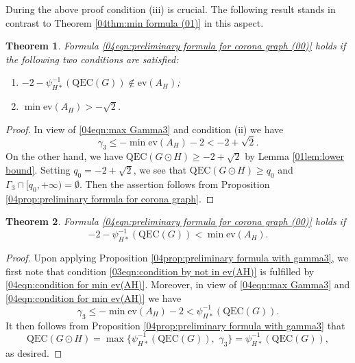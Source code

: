 \documentclass[12pt,a4paper]{article}
\newtheorem{theorem}{Theorem}[section]
\newcommand{\1}{{\bm 1}}
\numberwithin{equation}{section}
\begin{document}
During the above proof condition (iii) is crucial.
The following result stands in contrast to 
Theorem \ref{04thm:min formula (01)} in this aspect.

\begin{theorem}\label{04thm:min formula (02)}
Formula \eqref{04eqn:preliminary formula for corona graph (00)} holds if
the following two conditions are satisfied:
%
\begin{enumerate}
\item[\upshape (i)] 
$-2-\psi_{H*}^{-1}(\mathrm{QEC}(G)) \not\in\mathrm{ev}(A_H)$;
\item[\upshape (ii)]
$\min \mathrm{ev}(A_H)> -\sqrt{2}$.
\end{enumerate}
\end{theorem}

\begin{proof}
In view of \eqref{04eqn:max Gamma3} and condition (ii) we have
\[
\gamma_3
\le -\min \mathrm{ev}(A_H)-2
< -2+\sqrt2.
\]
On the other hand, we have
$\mathrm{QEC}(G\odot H)\ge -2+\sqrt2$ by Lemma \ref{01lem:lower bound}.
Setting $q_0=-2+\sqrt2$, we see that
$\mathrm{QEC}(G\odot H)\ge q_0$ and
$\Gamma_3\cap[q_0,+\infty)=\emptyset$.
Then the assertion follows from
Proposition \ref{04prop:preliminary formula for corona graph}.
\end{proof}


\begin{theorem}\label{04thm:min formula (03)}
Formula \eqref{04eqn:preliminary formula for corona graph (00)} holds if
%
\begin{equation}\label{04eqn:condition for min ev(AH)}
-2-\psi_{H*}^{-1}(\mathrm{QEC}(G))
<\min\mathrm{ev}(A_H).
\end{equation}
\end{theorem}

\begin{proof}
Upon applying Proposition 
\ref{04prop:preliminary formula with gamma3},
we first note that condition
\eqref{03eqn:condition by not in ev(AH)} is fulfilled
by \eqref{04eqn:condition for min ev(AH)}.
Moreover, in view of \eqref{04eqn:max Gamma3} 
and \eqref{04eqn:condition for min ev(AH)} we have
\[
\gamma_3 
\le-\min\mathrm{ev}(A_H)-2
<\psi_{H*}^{-1}(\mathrm{QEC}(G)).
\]
It then follows from Proposition 
\ref{04prop:preliminary formula with gamma3} that
\[
\mathrm{QEC}(G\odot H)
=\max \{\psi_{H*}^{-1}(\mathrm{QEC}(G)),\,\,\gamma_3\}
=\psi_{H*}^{-1}(\mathrm{QEC}(G)),
\]
as desired.
\end{proof}
\end{document}
